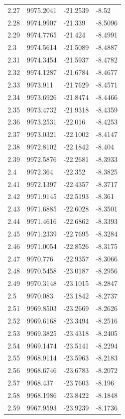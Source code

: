 \begin{table}[H]
\begin{tabular}{llll}
2.27 & 9975.2041 & -21.2539 & -8.52 \\
2.28 & 9974.9907 & -21.339 & -8.5096 \\
2.29 & 9974.7765 & -21.424 & -8.4991 \\
2.3 & 9974.5614 & -21.5089 & -8.4887 \\
2.31 & 9974.3454 & -21.5937 & -8.4782 \\
2.32 & 9974.1287 & -21.6784 & -8.4677 \\
2.33 & 9973.911 & -21.7629 & -8.4571 \\
2.34 & 9973.6926 & -21.8474 & -8.4466 \\
2.35 & 9973.4732 & -21.9318 & -8.4359 \\
2.36 & 9973.2531 & -22.016 & -8.4253 \\
2.37 & 9973.0321 & -22.1002 & -8.4147 \\
2.38 & 9972.8102 & -22.1842 & -8.404 \\
2.39 & 9972.5876 & -22.2681 & -8.3933 \\
2.4 & 9972.364 & -22.352 & -8.3825 \\
2.41 & 9972.1397 & -22.4357 & -8.3717 \\
2.42 & 9971.9145 & -22.5193 & -8.361 \\
2.43 & 9971.6885 & -22.6028 & -8.3501 \\
2.44 & 9971.4616 & -22.6862 & -8.3393 \\
2.45 & 9971.2339 & -22.7695 & -8.3284 \\
2.46 & 9971.0054 & -22.8526 & -8.3175 \\
2.47 & 9970.776 & -22.9357 & -8.3066 \\
2.48 & 9970.5458 & -23.0187 & -8.2956 \\
2.49 & 9970.3148 & -23.1015 & -8.2847 \\
2.5 & 9970.083 & -23.1842 & -8.2737 \\
2.51 & 9969.8503 & -23.2669 & -8.2626 \\
2.52 & 9969.6168 & -23.3494 & -8.2516 \\
2.53 & 9969.3825 & -23.4318 & -8.2405 \\
2.54 & 9969.1474 & -23.5141 & -8.2294 \\
2.55 & 9968.9114 & -23.5963 & -8.2183 \\
2.56 & 9968.6746 & -23.6783 & -8.2072 \\
2.57 & 9968.437 & -23.7603 & -8.196 \\
2.58 & 9968.1986 & -23.8422 & -8.1848 \\
2.59 & 9967.9593 & -23.9239 & -8.1736 \\

\end{tabular}
\end{table}
